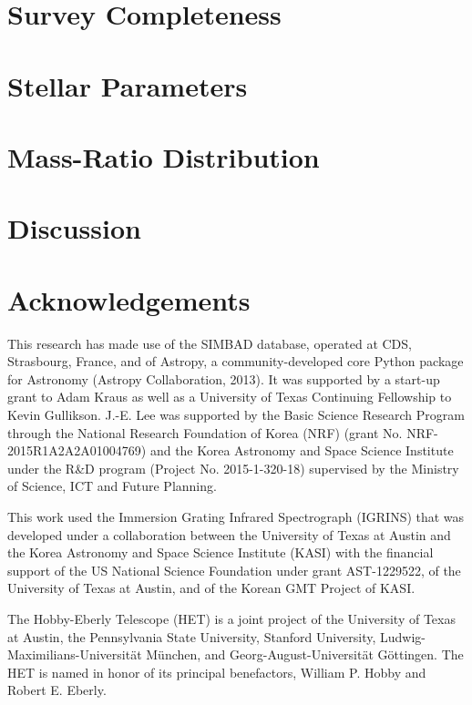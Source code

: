 \documentclass{emulateapj}
\begin{document}
\section{Survey Completeness}
\label{sec:completeness}

\section{Stellar Parameters}
\label{sec:sp}

\section{Mass-Ratio Distribution}
\label{sec:mrd}

\section{Discussion}
\label{sec:discussion}


\section*{Acknowledgements}
This research has made use of the SIMBAD database, operated at CDS, Strasbourg, France, and of Astropy, a community-developed core Python package for Astronomy (Astropy Collaboration, 2013).
It was supported by a start-up grant to Adam Kraus as well as a University of Texas Continuing Fellowship to Kevin Gullikson. J.-E. Lee was supported by the Basic Science Research Program through the National Research Foundation of Korea (NRF) (grant No. NRF-2015R1A2A2A01004769) and the Korea
Astronomy and Space Science Institute under the R\&D program (Project No. 2015-1-320-18) supervised by the Ministry of Science, ICT and Future Planning.

This work used the Immersion Grating Infrared Spectrograph (IGRINS) that was developed under a collaboration between the University of Texas at Austin and the Korea Astronomy and Space Science Institute (KASI) with the financial support of the US National Science Foundation under grant AST-1229522, of the University of Texas at Austin, and of the Korean GMT Project of KASI.

The Hobby-Eberly Telescope (HET) is a joint project of the University of Texas at Austin, the Pennsylvania State University, Stanford University, Ludwig-Maximilians-Universit\"at M\"unchen, and Georg-August-Universit\"at G\"ottingen. The HET is named in honor of its principal benefactors, William P. Hobby and Robert E. Eberly.
\end{document}
